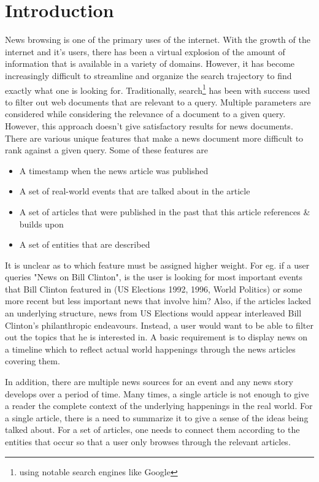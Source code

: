 \documentclass{acm_proc_article-sp}
\begin{document}
\section{Introduction}
News browsing is one of the primary uses of the internet. With the growth of the internet and it's users, there has been a virtual explosion of the amount of information that is available in a variety of domains. However, it has become increasingly difficult to streamline and organize the search trajectory to find exactly what one is looking for. Traditionally, search\footnote{using notable search engines like Google} has been with success used to filter out web documents that are relevant to a query. Multiple parameters are considered while considering the relevance of a document to a given query. However, this approach doesn't give satisfactory results for news documents. There are various unique features that make a news document more difficult to rank against a given query. Some of these features are
\begin{itemize}
\item A timestamp when the news article was published
\item A set of real-world events that are talked about in the article
\item A set of articles that were published in the past that this article references \& builds upon
\item A set of entities that are described
\end{itemize}

It is unclear as to which feature must be assigned higher weight. For eg. if a user queries "News on Bill Clinton", is the user is looking for most important events that Bill Clinton featured in (US Elections 1992, 1996, World Politics) or some more recent but less important news that involve him? Also, if the articles lacked an underlying structure, news from US Elections would appear interleaved Bill Clinton's philanthropic endeavours. Instead, a user would want to be able to filter out the topics that he is interested in. A basic requirement is to display news on a timeline which to reflect actual world happenings through the news articles covering them. 

In addition, there are multiple news sources for an event and any news story develops over a period of time. Many times, a single article is not enough to give a reader the complete context of the underlying happenings in the real world. For a single article, there is a need to summarize it to give a sense of the ideas being talked about. For a set of articles, one needs to connect them according to the entities that occur so that a user only browses through the relevant articles. 
\end{document}
